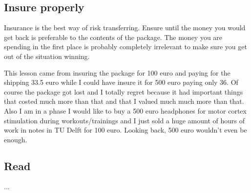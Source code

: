 \subsection{Insure properly}
Insurance is the best way of risk transferring. Ensure until the money you would get back is preferable to the contents of the package. The money you are spending in the first place is probably completely irrelevant to make sure you get out of the situation winning.

This lesson came from insuring the package for 100 euro and paying for the shipping 33.5 euro while I could have insure it for 500 euro paying only 36. Of course the package got lost and I totally regret because it had important things that costed much more than that and that I valued much much more than that. Also I am in a phase I would like to buy a 500 euro headphones for motor cortex stimulation during workouts/trainings and I just sold a huge amount of hours of work in notes in TU Delft for 100 euro. Looking back, 500 euro wouldn't even be enough.

\begin{center}
\end{center}



\subsection{Read}

...























